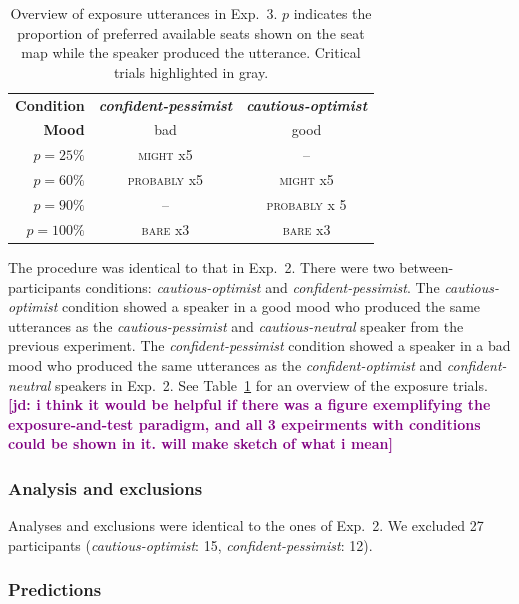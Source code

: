 \documentclass[man,floatsintext]{apa6}
\newcommand{\jd}[1]{\textcolor{Purple}{\bf [jd: #1]}}
\begin{document}
\begin{table}
\centering
\begin{tabular}{r|c | c }
\toprule 
     \textbf{Condition} & \textit{\textbf{confident-pessimist}} & \textit{\textbf{cautious-optimist}} \\
     \textbf{Mood} & bad  & good  \\ \midrule
     $p=25\%$ & \textsc{might} x5 & -- \\
     \cellcolor{LightGray} $p=60\%$ &  \cellcolor{LightGray} \textsc{probably} x5 & \cellcolor{LightGray} \textsc{might} x5 \\
     $p=90\%$ & -- &  \textsc{probably} x 5  \\
     $p=100\%$ & {\textsc{bare} x3} & {\textsc{bare} x3} \\
     \bottomrule
\end{tabular}
\caption{Overview of exposure utterances in Exp.~3. $p$ indicates the proportion of preferred available seats shown on the seat map while the speaker produced the utterance. Critical trials highlighted in gray.\label{tbl:exposure-overview-exp3}}
\end{table}


The procedure was identical to that in Exp.~2. There were two between-participants conditions: \textit{cautious-optimist} and \textit{confident-pessimist}. The \textit{cautious-optimist} condition showed a speaker in a good mood who produced the same utterances as the \textit{cautious-pessimist} and \textit{cautious-neutral} speaker from the previous experiment. The \textit{confident-pessimist} condition showed a speaker in a bad mood who produced the same utterances as the \textit{confident-optimist} and \textit{confident-neutral} speakers in Exp.~2. See Table~\ref{tbl:exposure-overview-exp3} for an overview of the exposure trials. \jd{i think it would be helpful if there was a figure exemplifying the exposure-and-test paradigm, and all 3 expeirments with conditions could be shown in it. will make sketch of what i mean}

\subsubsection{Analysis and exclusions}

Analyses and exclusions were identical to the ones of Exp.~2. We excluded 27 participants (\textit{cautious-optimist}: 15, \textit{confident-pessimist}: 12).

\subsubsection{Predictions}
\end{document}

